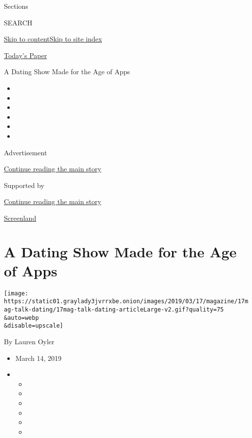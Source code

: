 Sections

SEARCH

\protect\hyperlink{site-content}{Skip to
content}\protect\hyperlink{site-index}{Skip to site index}

\href{https://myaccount.nytimes3xbfgragh.onion/auth/login?response_type=cookie\&client_id=vi}{}

\href{https://www.nytimes3xbfgragh.onion/section/todayspaper}{Today's
Paper}

A Dating Show Made for the Age of Apps

\begin{itemize}
\item
\item
\item
\item
\item
\item
\end{itemize}

Advertisement

\protect\hyperlink{after-top}{Continue reading the main story}

Supported by

\protect\hyperlink{after-sponsor}{Continue reading the main story}

\href{/column/screenland}{Screenland}

\hypertarget{a-dating-show-made-for-the-age-of-apps}{%
\section{A Dating Show Made for the Age of
Apps}\label{a-dating-show-made-for-the-age-of-apps}}

\texttt{[image: https://static01.graylady3jvrrxbe.onion/images/2019/03/17/magazine/17mag-talk-dating/17mag-talk-dating-articleLarge-v2.gif?quality=75\\\&auto=webp\\\&disable=upscale]}

By Lauren Oyler

\begin{itemize}
\item
  March 14, 2019
\item
  \begin{itemize}
  \item
  \item
  \item
  \item
  \item
  \item
  \end{itemize}
\end{itemize}

